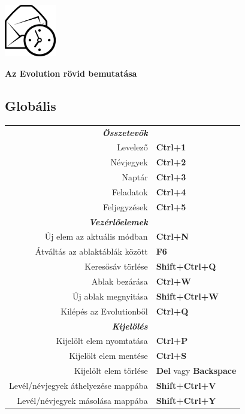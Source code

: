 \documentclass[12pt]{article}
\date {}
\begin{document}
	\begin{landscape}


	\begin{center}
	\begin{minipage}[m]
		{1in}\includegraphics[height=0.9in]{../evolution-logo.eps}\hspace{5mm}
	\end{minipage}
	\hspace{5mm}
	\textbf{\Huge{Az Evolution rövid bemutatása}}
	\end{center}

	\begin{center}
	\begin{multicols}{2}
	\section*{Globális}
	\begin{tabular*}{4in}{rp{1.5in}}
		\textit{\textbf{Összetevők}}		&					\\
		Levelező				& \textbf{Ctrl+1}			\\
		Névjegyek				& \textbf{Ctrl+2}			\\
		Naptár					& \textbf{Ctrl+3}			\\
		Feladatok				& \textbf{Ctrl+4}			\\
		\vspace{1.5mm}
		Feljegyzések				& \textbf{Ctrl+5}			\\
		\textit{\textbf{Vezérlőelemek}}		&					\\
		Új elem az aktuális módban		& \textbf{Ctrl+N}			\\
		Átváltás az ablaktáblák között		& \textbf{F6}				\\
		Keresősáv törlése			& \textbf{Shift+Ctrl+Q}			\\
		Ablak bezárása				& \textbf{Ctrl+W}			\\
		Új ablak megnyitása			& \textbf{Shift+Ctrl+W}			\\
		\vspace{1.5mm}
		Kilépés az Evolutionből			& \textbf{Ctrl+Q}			\\
		\textit{\textbf{Kijelölés}}		&					\\
		Kijelölt elem nyomtatása		& \textbf{Ctrl+P}			\\
		Kijelölt elem mentése			& \textbf{Ctrl+S}			\\
		Kijelölt elem törlése			& \textbf{Del} vagy \textbf{Backspace}	\\
		Levél/névjegyek áthelyezése mappába	& \textbf{Shift+Ctrl+V}			\\
		Levél/névjegyek másolása mappába	& \textbf{Shift+Ctrl+Y}			\\
	\end{tabular*}

\end{multicols}
\end{center}
\end{landscape}
\end{document}
